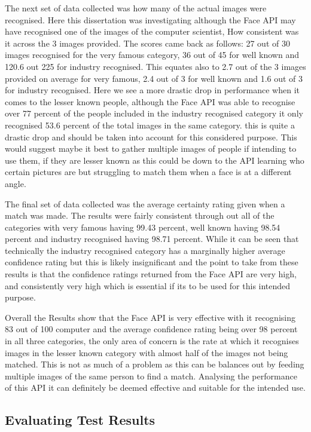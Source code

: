 \documentclass[12pt,a4paper]{article}
\begin{document}
The next set of data collected was how many of the actual images were recognised. Here this dissertation was investigating although the Face API may have recognised one of the images of the computer scientist, How consistent was it across the 3 images provided. The scores came back as follows: 27 out of 30 images recognised for the very famous category, 36 out of 45 for well known and 120.6 out 225 for industry recognised. This equates also to 2.7 out of the 3 images provided on average for very famous, 2.4 out of 3 for well known and 1.6 out of 3 for industry recognised. Here we see a more drastic drop in performance when it comes to the lesser known people, although the Face API was able to recognise over 77 percent of the people included in the industry recognised category it only recognised 53.6 percent of the total images in the same category. this is quite a drastic drop and should be taken into account for this considered purpose. This would suggest maybe it best to gather multiple images of people if intending to use them, if they are lesser known as this could be down to the API learning who certain pictures are but struggling to match them when a face is at a different angle.  

The final set of data collected was the average certainty rating given when a match was made. The results were fairly consistent through out all of the categories with very famous having 99.43 percent, well known having 98.54 percent and industry recognised having 98.71 percent. While it can be seen that technically the industry recognised category has a marginally higher average confidence rating but this is likely insignificant and the point to take from these results is that the confidence ratings returned from the Face API are very high, and consistently very high which is essential if its to be used for this intended purpose. 

Overall the Results show that the Face API is very effective with it recognising 83 out of 100 computer and the average confidence rating being over 98 percent in all three categories, the only area of concern is the rate at which it recognises images in the lesser known category with almost half of the images not being matched. This is not as much of a problem as this can be balances out by feeding multiple images of the same person to find a match. Analysing the performance of this API it can definitely be deemed effective and suitable for the intended use. 

\subsection{Evaluating Test Results} 
\end{document}
